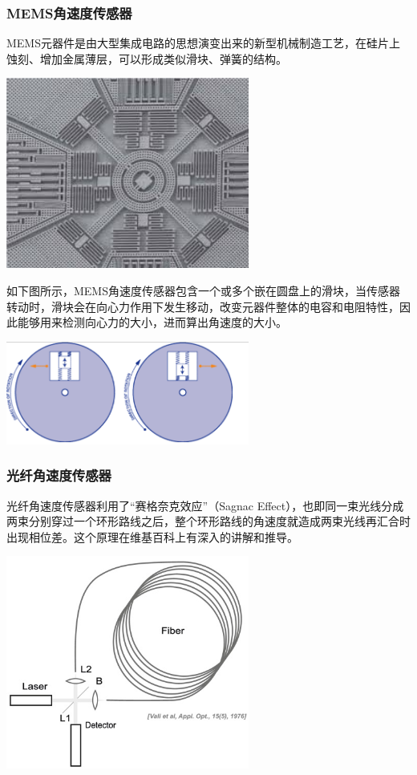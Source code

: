 \documentclass[11pt]{article}
\begin{document}
\subsubsection{MEMS角速度传感器}
MEMS元器件是由大型集成电路的思想演变出来的新型机械制造工艺，在硅片上蚀刻、增加金属薄层，可以形成类似滑块、弹簧的结构。

\begin{center}
\includegraphics[width=0.6\textwidth]{images/memsgyro0.jpg}
\end{center}

如下图所示，MEMS角速度传感器包含一个或多个嵌在圆盘上的滑块，当传感器转动时，滑块会在向心力作用下发生移动，改变元器件整体的电容和电阻特性，因此能够用来检测向心力的大小，进而算出角速度的大小。

\begin{center}
\includegraphics[width=0.6\textwidth]{images/memsgyro.png}
\end{center}
\subsubsection{光纤角速度传感器}
光纤角速度传感器利用了“赛格奈克效应”（Sagnac Effect），也即同一束光线分成两束分别穿过一个环形路线之后，整个环形路线的角速度就造成两束光线再汇合时出现相位差。这个原理在维基百科上有深入的讲解和推导。

\begin{center}
\includegraphics[width=0.6\textwidth]{images/sagnaceffect.jpg}
\end{center}
\end{document}
